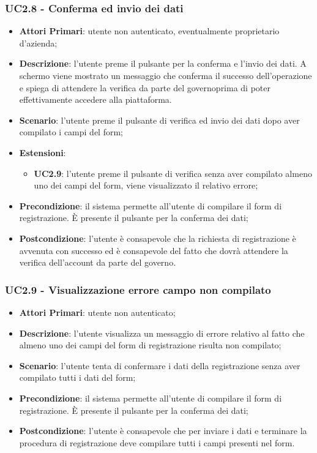 \subsubsection{UC2.8 - Conferma ed invio dei dati}
\begin{itemize}
	\item \textbf{Attori Primari}: utente non autenticato, eventualmente proprietario d'azienda;
	\item \textbf{Descrizione}:
	l'utente preme il pulsante per la conferma e l'invio dei dati. A schermo viene mostrato un messaggio che conferma il successo dell'operazione e spiega di attendere la verifica da parte del governo\glosp prima di poter effettivamente accedere alla piattaforma.
	\item \textbf{Scenario}: l'utente preme il pulsante di verifica ed invio dei dati dopo aver compilato i campi del form;
	\item \textbf{Estensioni}: 
	\begin{itemize}
		\item \textbf{UC2.9}: l'utente preme il pulsante di verifica senza aver compilato almeno uno dei campi del form, viene visualizzato il relativo errore;
	\end{itemize}
	\item \textbf{Precondizione}: il sistema permette all'utente di compilare il form di registrazione. \`E presente il pulsante per la conferma dei dati;
	\item \textbf{Postcondizione}:
	l'utente è consapevole che la richiesta di registrazione è avvenuta con successo ed è consapevole del fatto che dovrà attendere la verifica dell'account da parte del governo\glo.
\end{itemize}

\subsubsection{UC2.9 - Visualizzazione errore campo non compilato}
\begin{itemize}
	\item \textbf{Attori Primari}: utente non autenticato;
	\item \textbf{Descrizione}:
	l'utente visualizza un messaggio di errore relativo al fatto che almeno uno dei campi del form di registrazione risulta non compilato;
	\item \textbf{Scenario}: l'utente tenta di confermare i dati della registrazione senza aver compilato tutti i dati del form;
	\item \textbf{Precondizione}: il sistema permette all'utente di compilare il form di registrazione. \`E presente il pulsante per la conferma dei dati;
	\item \textbf{Postcondizione}:
	l'utente è consapevole che per inviare i dati e terminare la procedura di registrazione deve compilare tutti i campi presenti nel form.
\end{itemize}








